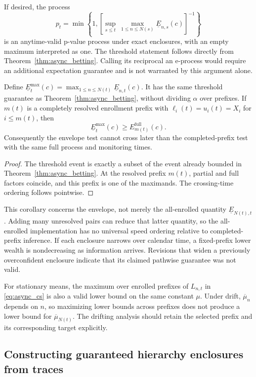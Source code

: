 If desired, the process
\[
 p_t=\min\!\left\{1,
 \left[\sup_{s\leq t}\ \max_{1\leq n\leq N(s)}
                         \underline E_{n,s}(c)\right]^{-1}\right\}
\]
is an anytime-valid p-value process under exact enclosures, with an empty
maximum interpreted as one. The threshold statement follows directly
from Theorem~\ref{thm:async_betting}. Calling its reciprocal an e-process
would require an additional expectation guarantee and is not warranted
by this argument alone.

\begin{corollary}
\label{cor:async_envelope}
Define $\underline E_t^{\max}(c)
=\max_{1\leq n\leq N(t)}\underline E_{n,t}(c)$. It has the same
threshold guarantee as Theorem~\ref{thm:async_betting}, without dividing
$\alpha$ over prefixes. If $m(t)$ is a completely resolved enrollment
prefix with $\ell_i(t)=u_i(t)=X_i$ for $i\leq m(t)$, then
\[
 \underline E_t^{\max}(c)\geq E_{m(t)}^{\mathrm{full}}(c).
\]
Consequently the envelope test cannot cross later than the
completed-prefix test with the same full process and monitoring times.
\end{corollary}
\begin{proof}
The threshold event is exactly a subset of the event already bounded in
Theorem~\ref{thm:async_betting}. At the resolved prefix $m(t)$, partial
and full factors coincide, and this prefix is one of the maximands.
The crossing-time ordering follows pointwise.
\end{proof}

This corollary concerns the envelope, not merely the all-enrolled
quantity $\underline E_{N(t),t}$. Adding many unresolved pairs can reduce
that latter quantity, so the all-enrolled implementation has no universal
speed ordering relative to completed-prefix inference. If each enclosure
narrows over calendar time, a fixed-prefix lower wealth is nondecreasing
as information arrives. Revisions that widen a previously overconfident
enclosure indicate that its claimed pathwise guarantee was not valid.

For stationary means, the maximum over enrolled prefixes of $L_{n,t}$
in \eqref{eq:async_cs} is also a valid lower bound on the same constant
$\mu$. Under drift, $\overline\mu_n$ depends on $n$, so maximizing
lower bounds across prefixes does not produce a lower bound for
$\overline\mu_{N(t)}$. The drifting analysis should retain the selected
prefix and its corresponding target explicitly.

\subsection{Constructing guaranteed hierarchy enclosures from traces}

